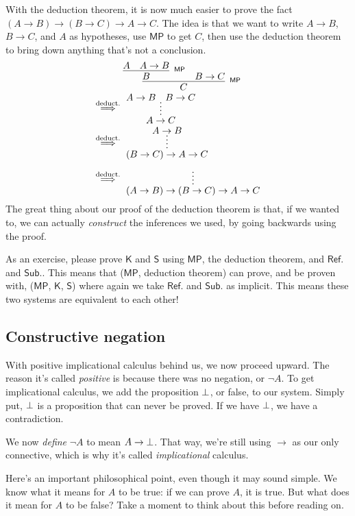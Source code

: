 \documentclass[11pt,paper=letter]{scrartcl}
\newcommand{\sf}{\mathsf}
\renewcommand{\lnot}{\neg}
\newcommand{\vc}[1]{\vcenter{\hbox{#1}}}
\begin{document}
With the deduction theorem, it is now much easier to prove the fact $(A \to B) \to (B \to C) \to A \to C$. The idea is that we want to write $A \to B$, $B \to C$, and $A$ as hypotheses, use $\sf{MP}$ to get $C$, then use the deduction theorem to bring down anything that's not a conclusion.
\begin{align*}
&\vc{\infer[^\sf{MP}]
{C}
{
\infer[^\sf{MP}]{B}{A & A \to B}
& B \to C
}}\\
\;\overset{\text{deduct.}}{\implies}\;&
\vc{
\infer*
{A \to C}
{A \to B & B \to C}
}\\
\;\overset{\text{deduct.}}{\implies}\;&
\vc{
\infer*
{(B \to C) \to A \to C}
{A \to B}
}\\
\;\overset{\text{deduct.}}{\implies}\;&
\vc{
\infer*
{(A \to B) \to (B \to C) \to A \to C}
{\phantom{A}}
}
\end{align*}
The great thing about our proof of the deduction theorem is that, if we wanted to, we can actually \emph{construct} the inferences we used, by going backwards using the proof.

As an exercise, please prove $\sf{K}$ and $\sf{S}$ using $\sf{MP}$, the deduction theorem, and $\sf{Ref.}$ and $\sf{Sub.}$. This means that ($\sf{MP}$, deduction theorem) can prove, and be proven with, ($\sf{MP}$, $\sf{K}$, $\sf{S}$) where again we take $\sf{Ref.}$ and $\sf{Sub.}$ as implicit. This means these two systems are equivalent to each other!

\subsection{Constructive negation}

With positive implicational calculus behind us, we now proceed upward. The reason it's called \emph{positive} is because there was no negation, or $\lnot A$. To get implicational calculus, we add the proposition $\bot$, or false, to our system. Simply put, $\bot$ is a proposition that can never be proved. If we have $\bot$, we have a contradiction.

We now \emph{define} $\lnot A$ to mean $A \to \bot$. That way, we're still using $\to$ as our only connective, which is why it's called \emph{implicational} calculus.

Here's an important philosophical point, even though it may sound simple. We know what it means for $A$ to be true: if we can prove $A$, it is true. But what does it mean for $A$ to be false? Take a moment to think about this before reading on.
\end{document}
